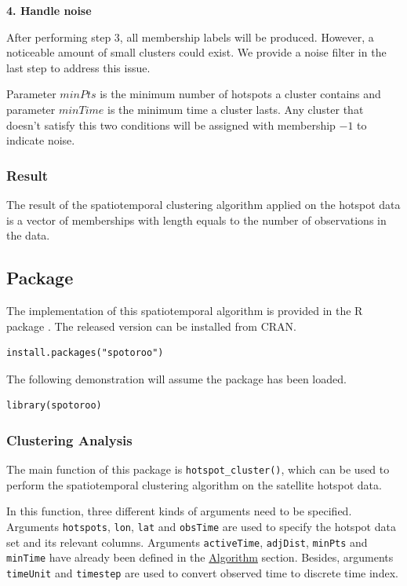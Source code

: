\textbf{4. Handle noise}

After performing step 3, all membership labels will be produced.
However, a noticeable amount of small clusters could exist. We provide a
noise filter in the last step to address this issue.

Parameter \(minPts\) is the minimum number of hotspots a cluster
contains and parameter \(minTime\) is the minimum time a cluster lasts.
Any cluster that doesn't satisfy this two conditions will be assigned
with membership \(-1\) to indicate noise.

\hypertarget{result}{%
\subsubsection{Result}\label{result}}

The result of the spatiotemporal clustering algorithm applied on the
hotspot data is a vector of memberships with length equals to the number
of observations in the data.

\hypertarget{package}{%
\subsection{Package}\label{package}}

The implementation of this spatiotemporal algorithm is provided in the R
package . The released version can be installed from
CRAN.

\begin{verbatim}
install.packages("spotoroo")
\end{verbatim}

The following demonstration will assume the package 
has been loaded.

\begin{verbatim}
library(spotoroo)
\end{verbatim}

\hypertarget{clustering-analysis}{%
\subsubsection{Clustering Analysis}\label{clustering-analysis}}

The main function of this package is \texttt{hotspot\_cluster()}, which
can be used to perform the spatiotemporal clustering algorithm on the
satellite hotspot data.

In this function, three different kinds of arguments need to be
specified. Arguments \texttt{hotspots}, \texttt{lon}, \texttt{lat} and
\texttt{obsTime} are used to specify the hotspot data set and its
relevant columns. Arguments \texttt{activeTime}, \texttt{adjDist},
\texttt{minPts} and \texttt{minTime} have already been defined in the
\protect\hyperlink{algorithm}{Algorithm} section. Besides, arguments
\texttt{timeUnit} and \texttt{timestep} are used to convert observed
time to discrete time index.

